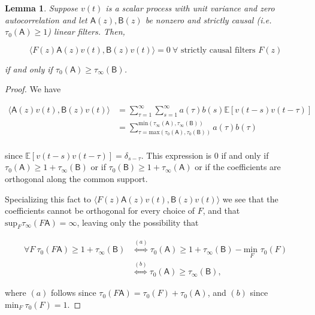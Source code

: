 \documentclass{statsoc}
\def\B{\mathsf{B}}  %
\def\A{\mathsf{A}}  %
\newtheorem{lemma}{Lemma}
\def\E{\mathbb{E}}  %
\newcommand{\inner}[2]{\langle #1, #2 \rangle}  %
\begin{document}
\begin{lemma}
  \label{lem:time_lag_cancellation}
  Suppose $v(t)$ is a scalar process with unit variance and zero
  autocorrelation and let $\A(z), \B(z)$ be nonzero and strictly
  causal (i.e. $\tau_0(\A) \ge 1$) linear filters.  Then,

  \begin{equation}
    \inner{F(z)\A(z)v(t)}{\B(z)v(t)} = 0\ \forall \text{ strictly causal filters } F(z)
  \end{equation}

  if and only if $\tau_0(\A) \ge \tau_\infty(\B)$.
\end{lemma}
\begin{proof}
  We have

  \begin{align}
    \inner{\A(z)v(t)}{\B(z)v(t)} &= \sum_{\tau = 1}^\infty \sum_{s = 1}^\infty a(\tau)b(s)\E[v(t - s)v(t - \tau)]\\
    &= \sum_{\tau = \text{max}(\tau_0(\A), \tau_0(\B))}^{\text{min}(\tau_\infty(\A), \tau_\infty(\B))} a(\tau) b(\tau)\\
  \end{align}

  since $\E[v(t - s)v(t - \tau)] = \delta_{s - \tau}$.  This expression is
  $0$ if and only if $\tau_0(\A) \ge 1 + \tau_\infty(\B)$ or if
  $\tau_0(\B) \ge 1 + \tau_\infty(\A)$ or if the coefficients are orthogonal along
  the common support.

  Specializing this fact to $\inner{F(z)\A(z)v(t)}{\B(z)v(t)}$ we
  see that the coefficients cannot be orthogonal for every choice of
  $F$, and that $\text{sup}_F \tau_\infty(F\A) = \infty$, leaving only
  the possibility that

  \begin{align*}
     \forall F\ \tau_0(F\A) \ge 1 + \tau_\infty(\B) &\overset{(a)}{\iff} \tau_0(\A) \ge 1 + \tau_\infty(\B) - \underset{F}{\text{min }} \tau_0(F)\\
    &\overset{(b)}{\iff} \tau_0(\A) \ge \tau_\infty(\B),
  \end{align*}

  where $(a)$ follows since $\tau_0(F\A) = \tau_0(F) + \tau_0(\A)$,
  and $(b)$ since $\text{min}_F\ \tau_0(F) = 1$.
\end{proof}
\end{document}
